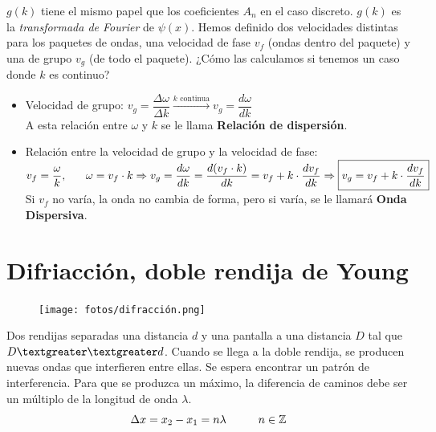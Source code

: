 \documentclass{report}
\begin{document}
    \noindent $g(k)$ tiene el mismo papel que los coeficientes $A_n$ en el 
    caso discreto. $g(k)$ es la \textit{transformada de Fourier} de $\psi(x)$.
    \noindent Hemos definido dos velocidades distintas para los paquetes de ondas, 
    una velocidad de fase $v_f$ (ondas dentro del paquete) y una de grupo $v_g$ (de 
    todo el paquete). ¿Cómo las calculamos si tenemos un caso donde $k$ es continuo?

    \begin{itemize}
      \item Velocidad de grupo: $v_g=\dfrac{\Delta\omega}{\Delta k}\xrightarrow{k 
            \text{ continua}}v_g=\dfrac{d\omega}{dk}$\\ 
            
            \vspace{-0.2cm}A esta relación entre $\omega$ y $k$ se le llama \textbf{Relación 
            de dispersión}.
      \item Relación entre la velocidad de grupo y la velocidad de fase:\\
            $v_f=\dfrac{\omega}{k},\hspace{0.6cm}\omega=v_f\cdot k\Rightarrow v_g=
            \dfrac{d\omega}{dk}=\dfrac{d(v_f\cdot k)}{dk}=v_f+k\cdot\dfrac{dv_f}{dk}
            \Rightarrow\boxed{v_g=v_f+k\cdot\dfrac{dv_f}{dk}}$\\

            \vspace{-0.2cm}Si $v_f$ no varía, la onda no cambia de forma, pero si varía, se le  
            llamará \textbf{Onda Dispersiva}.
    \end{itemize}
  \section{Difriacción, doble rendija de Young}
    \begin{figure}
      \vspace{-0.6cm}
      \texttt{[image: fotos/difracción.png]}
    \end{figure}
    \noindent Dos rendijas separadas una distancia $d$ y una pantalla a una distancia $D$ tal
    que $D\textgreater\textgreater d$. Cuando se llega a la doble rendija, se producen nuevas ondas que interfieren
    entre ellas. Se espera encontrar un patrón de interferencia. Para que se produzca un 
    máximo, la diferencia de caminos debe ser un múltiplo de la longitud de onda $\lambda$.
    \[\Delta x=x_2-x_1=n\lambda\hspace{1cm}n\in\mathbb{Z}\]
\end{document}

